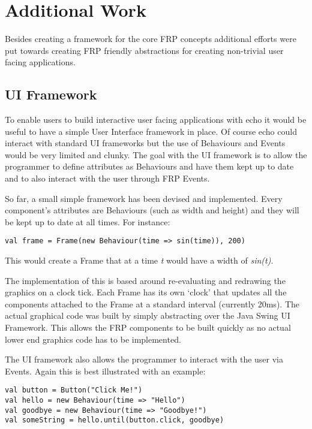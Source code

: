 \chapter{Additional Work}
  Besides creating a framework for the core FRP concepts additional efforts
  were put towards creating FRP friendly abstractions for creating non-trivial user facing
  applications.
  
  \section{UI Framework}
    To enable users to build interactive user facing applications with echo it would be useful to have a simple User 
    Interface framework in place. Of course echo could interact with standard UI frameworks but the use of Behaviours 
    and Events would be very limited and clunky. The goal with the UI framework is to allow the programmer to define 
    attributes as Behaviours and have them kept up to date and to also interact with the user through FRP 
    Events. 

    So far, a small simple framework has been devised and implemented. Every component's attributes are Behaviours
    (such as width and height) and they will be kept up to date at all times. For instance:

\begin{verbatim}
val frame = Frame(new Behaviour(time => sin(time)), 200) 
\end{verbatim}

    This would create a Frame that at a time \emph{t} would have a width of \emph{sin(t)}.

    The implementation of this is based around re-evaluating and redrawing the graphics on a clock tick. Each 
    Frame has its own `clock' that updates all the components attached to the Frame at a standard interval (currently 
    20ms). The actual graphical code was built by simply abstracting over the Java Swing UI Framework. This allows the FRP 
    components to be built quickly as no actual lower end graphics code has to be implemented.

    The UI framework also allows the programmer to interact with the user via Events. Again this is best illustrated 
    with an example:

\begin{verbatim}
val button = Button("Click Me!") 
val hello = new Behaviour(time => "Hello")
val goodbye = new Behaviour(time => "Goodbye!")
val someString = hello.until(button.click, goodbye) 
\end{verbatim}

